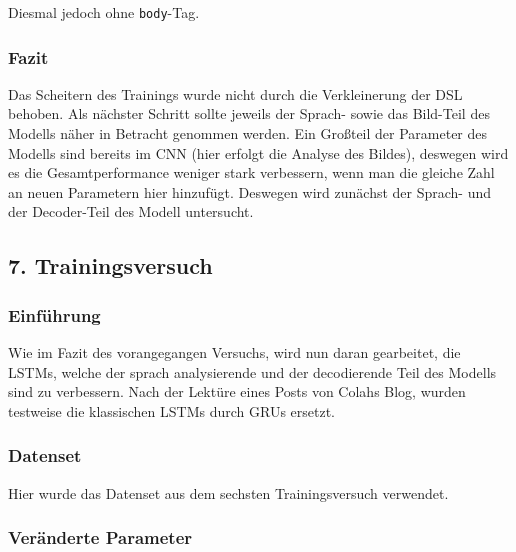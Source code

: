 \documentclass[pdftex,a4paper,halfparskip, article]{scrartcl}
\begin{document}
Diesmal jedoch ohne \texttt{body}-Tag.


\subsubsection*{Fazit}

Das Scheitern des Trainings wurde nicht durch die Verkleinerung der DSL behoben. Als nächster Schritt sollte jeweils der Sprach- sowie das Bild-Teil des Modells näher in Betracht genommen werden. Ein Großteil der Parameter des Modells sind bereits im CNN (hier erfolgt die Analyse des Bildes), deswegen wird es die Gesamtperformance weniger stark verbessern, wenn man die gleiche Zahl an neuen Parametern hier hinzufügt. Deswegen wird zunächst der Sprach- und der Decoder-Teil des Modell untersucht.

\subsection{7. Trainingsversuch}


\subsubsection*{Einführung}

Wie im Fazit des vorangegangen Versuchs, wird nun daran gearbeitet, die LSTMs, welche der sprach analysierende und der decodierende Teil des Modells sind zu verbessern. Nach der Lektüre eines Posts von Colahs Blog, wurden testweise die klassischen LSTMs durch GRUs ersetzt.

\subsubsection*{Datenset}

Hier wurde das Datenset aus dem sechsten Trainingsversuch verwendet.

\subsubsection*{Veränderte Parameter}
\end{document}
